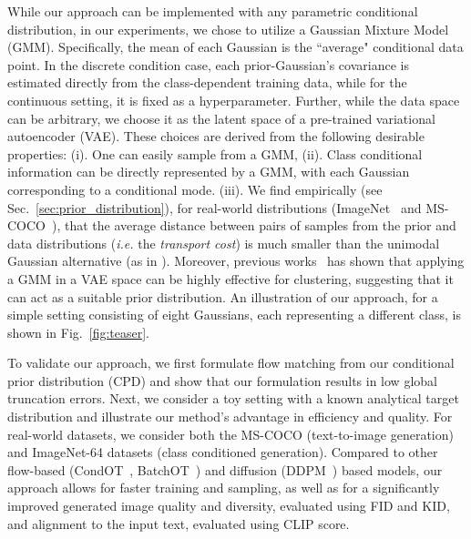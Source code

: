 While our approach can be implemented with any parametric conditional distribution, in our experiments, we chose to utilize a Gaussian Mixture Model (GMM). Specifically, the mean of each Gaussian is the ``average" conditional data point. In the discrete condition case, each prior-Gaussian's covariance is estimated directly from the class-dependent training data, while for the continuous setting, it is fixed as a hyperparameter. 
Further, while the data space can be arbitrary, we choose it as the latent space of a pre-trained variational autoencoder (VAE). These choices are derived from the following desirable properties: (i). 
One can easily sample from a GMM, (ii). Class conditional information can be directly represented by a GMM, with each Gaussian corresponding to a conditional mode.  (iii). We find empirically (see Sec.~\ref{sec:prior_distribution}), for real-world distributions (ImageNet~\cite{deng2009imagenet} and MS-COCO~\cite{lin2014microsoft}), that the average distance between pairs of samples from the prior and data distributions (\emph{i.e.} the \emph{transport cost}) is much smaller than the unimodal Gaussian alternative (as in \cite{lipman2022flow, pooladian2023multisample}). Moreover, previous works~\cite{jiang2017variationaldeepembeddingunsupervised, Bull_2021, hinton2006reducing} has shown that applying a GMM in a VAE space can be highly effective for clustering, suggesting that it can act as a suitable prior distribution. 
An illustration of our approach, for a simple setting consisting of eight Gaussians, each representing a different class, is shown in Fig.~\ref{fig:teaser}.


To validate our approach, we first formulate flow matching from our conditional prior distribution (CPD) and show that our formulation results in low global truncation errors.
Next, we consider a toy setting with a known analytical target distribution and illustrate our method's advantage in efficiency and quality. 
For real-world datasets, we consider both the MS-COCO (text-to-image generation) and ImageNet-64 datasets (class conditioned generation). Compared to other flow-based (CondOT~\cite{lipman2022flow}, BatchOT~\cite{pooladian2023multisample}) and diffusion (DDPM~\cite{Ho2020DDPM}) based models, our approach allows for faster training and sampling, as well as for a significantly improved generated image quality and diversity, evaluated using FID and KID, and alignment to the input text, evaluated using CLIP score. 
